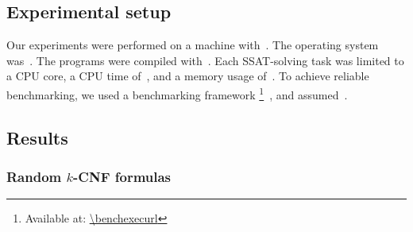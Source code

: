 \subsection{Experimental setup}
Our experiments were performed on a machine with~\machineSpec.
The operating system was~\osInfo.
The programs were compiled with~\compiler.
Each SSAT-solving task was limited to a CPU core,
a CPU time of~\timelimit,
and a memory usage of~\memlimit.
To achieve reliable benchmarking,
we used a benchmarking framework \benchexec\footnote{Available at: \url{\benchexecurl}}~\cite{Benchmarking-STTT},
and assumed~\measurement.

\subsection{Results}

\subsubsection{Random $k$-CNF formulas}


